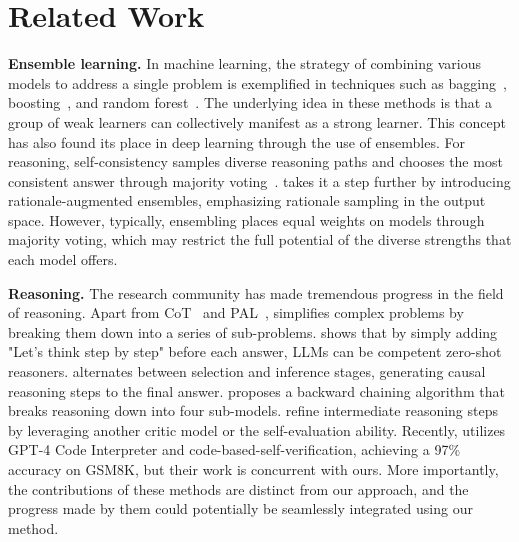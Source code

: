 \documentclass[11pt]{article}
\begin{document}
\section{Related Work}
\textbf{Ensemble learning.} In machine learning, the strategy of combining various models to address a single problem is exemplified in techniques such as bagging~\citep{breiman1996bagging}, boosting~\citep{freund1997decision, chen2016xgboost,ke2017lightgbm}, and random forest~\citep{ho1995random, breiman2001random}. The underlying idea in these methods is that a group of weak learners can collectively manifest as a strong learner. This concept has also found its place in deep learning through the use of ensembles. For reasoning, self-consistency samples diverse reasoning paths and chooses the most consistent answer through majority voting~\citep{Wang2022SelfConsistencyIC}. \citet{Wang2022RationaleAugmentedEI} takes it a step further by introducing rationale-augmented ensembles, emphasizing rationale sampling in the output space. However, typically, ensembling places equal weights on models through majority voting, which may restrict the full potential of the diverse strengths that each model offers.

\textbf{Reasoning.} 
The research community has made tremendous progress in the field of reasoning. Apart from CoT~\citep{Wei2022ChainOT} and PAL~\citep{Gao2022PALPL, Chen2022ProgramOT}, \citet{Zhou2022LeasttoMostPE} simplifies complex problems by breaking them down into a series of sub-problems. \citet{Kojima2022LargeLM} shows that by simply adding "Let's think step by step" before each answer, LLMs can be competent zero-shot reasoners. \citet{Creswell2022SelectionInferenceEL} alternates between selection and inference stages, generating causal reasoning steps to the final answer. \citet{Kazemi2022LAMBADABC} proposes a backward chaining algorithm that breaks reasoning down into four sub-models. 
\citet{Paul2023REFINERRF, Xie2023DecompositionER, Yao2023TreeOT} refine intermediate reasoning steps by leveraging another critic model or the self-evaluation ability. Recently, \citet{Zhou2023SolvingCM} utilizes GPT-4 Code Interpreter and code-based-self-verification, achieving a 97\% accuracy on GSM8K, but their work is concurrent with ours. More importantly, the contributions of these methods are distinct from our approach, and the progress made by them could potentially be seamlessly integrated using our method.
\end{document}
